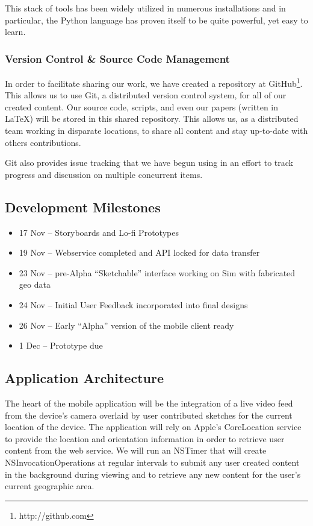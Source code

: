 \documentclass{chi2009}
\begin{document}
This stack of tools has been widely utilized in numerous installations and in
particular, the Python language has proven itself to be quite powerful, yet
easy to learn.

\subsubsection{ Version Control \& Source Code Management }

In order to facilitate sharing our work, we have created a repository at
GitHub\footnote{http://github.com}.  This allows us to use Git, a distributed
version control system, for all of our created content.  Our source code,
scripts, and even our papers (written in \LaTeX) will be stored in this shared
repository.  This allows us, as a distributed team working in disparate
locations, to share all content and stay up-to-date with others contributions.

Git also provides issue tracking that we have begun using in an effort to track
progress and discussion on multiple concurrent items.

\subsection{ Development Milestones  }

\begin{itemize}
\item 17 Nov -- Storyboards and Lo-fi Prototypes
\item 19 Nov -- Webservice completed and API locked for data transfer
\item 23 Nov -- pre-Alpha ``Sketchable'' interface working on Sim with fabricated geo data
\item 24 Nov -- Initial User Feedback incorporated into final designs
\item 26 Nov -- Early ``Alpha'' version of the mobile client ready
\item 1 Dec -- Prototype due

\end{itemize}

\subsection{ Application Architecture }

The heart of the mobile application will be the integration of a live video
feed from the device's camera overlaid by user contributed sketches for the
current location of the device.  The application will rely on Apple's
CoreLocation service to provide the location and orientation information in
order to retrieve user content from the web service.  We will run an NSTimer
that will create NSInvocationOperations at regular intervals to submit any user
created content in the background during viewing and to retrieve any new
content for the user's current geographic area.
\end{document}
